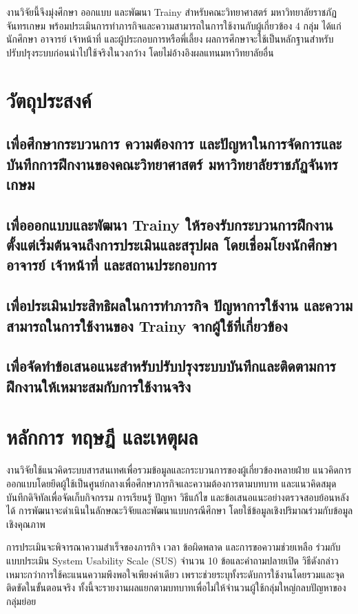 \documentclass[17pt,a4paper,oneside]{extarticle}
\begin{document}
งานวิจัยนี้จึงมุ่งศึกษา ออกแบบ และพัฒนา Trainy สำหรับคณะวิทยาศาสตร์ มหาวิทยาลัยราชภัฏจันทรเกษม พร้อมประเมินการทำภารกิจและความสามารถในการใช้งานกับผู้เกี่ยวข้อง 4 กลุ่ม ได้แก่ นักศึกษา อาจารย์ เจ้าหน้าที่ และผู้ประกอบการหรือพี่เลี้ยง ผลการศึกษาจะใช้เป็นหลักฐานสำหรับปรับปรุงระบบก่อนนำไปใช้จริงในวงกว้าง โดยไม่อ้างอิงผลแทนมหาวิทยาลัยอื่น

\section{วัตถุประสงค์}
\subsection{เพื่อศึกษากระบวนการ ความต้องการ และปัญหาในการจัดการและบันทึกการฝึกงานของคณะวิทยาศาสตร์ มหาวิทยาลัยราชภัฏจันทรเกษม}
\subsection{เพื่อออกแบบและพัฒนา Trainy ให้รองรับกระบวนการฝึกงานตั้งแต่เริ่มต้นจนถึงการประเมินและสรุปผล โดยเชื่อมโยงนักศึกษา อาจารย์ เจ้าหน้าที่ และสถานประกอบการ}
\subsection{เพื่อประเมินประสิทธิผลในการทำภารกิจ ปัญหาการใช้งาน และความสามารถในการใช้งานของ Trainy จากผู้ใช้ที่เกี่ยวข้อง}
\subsection{เพื่อจัดทำข้อเสนอแนะสำหรับปรับปรุงระบบบันทึกและติดตามการฝึกงานให้เหมาะสมกับการใช้งานจริง}

\section{หลักการ ทฤษฎี และเหตุผล}
งานวิจัยใช้แนวคิดระบบสารสนเทศเพื่อรวมข้อมูลและกระบวนการของผู้เกี่ยวข้องหลายฝ่าย แนวคิดการออกแบบโดยยึดผู้ใช้เป็นศูนย์กลางเพื่อศึกษาภารกิจและความต้องการตามบทบาท และแนวคิดสมุดบันทึกดิจิทัลเพื่อจัดเก็บกิจกรรม การเรียนรู้ ปัญหา วิธีแก้ไข และข้อเสนอแนะอย่างตรวจสอบย้อนหลังได้ การพัฒนาจะดำเนินในลักษณะวิจัยและพัฒนาแบบกรณีศึกษา โดยใช้ข้อมูลเชิงปริมาณร่วมกับข้อมูลเชิงคุณภาพ

การประเมินจะพิจารณาความสำเร็จของภารกิจ เวลา ข้อผิดพลาด และการขอความช่วยเหลือ ร่วมกับแบบประเมิน System Usability Scale (SUS) จำนวน 10 ข้อและคำถามปลายเปิด วิธีดังกล่าวเหมาะกว่าการใช้คะแนนความพึงพอใจเพียงค่าเดียว เพราะช่วยระบุทั้งระดับการใช้งานโดยรวมและจุดติดขัดในขั้นตอนจริง ทั้งนี้จะรายงานผลแยกตามบทบาทเพื่อไม่ให้จำนวนผู้ใช้กลุ่มใหญ่กลบปัญหาของกลุ่มย่อย
\end{document}
